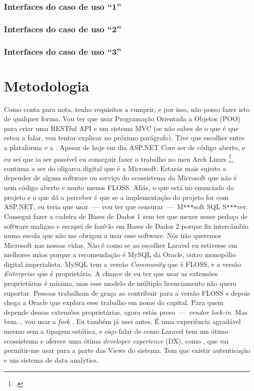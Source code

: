 \documentclass[12pt,a4paper,openright,oneside]{memoir}
\begin{document}
\subsubsection{Interfaces do caso de uso “1”}
\subsubsection{Interfaces do caso de uso “2”}
\subsubsection{Interfaces do caso de uso “3”}

\section{Metodologia}

Como conta para nota, tenho requisitos a cumprir, e por isso, não posso fazer
isto de qualquer forma. Vou ter que usar Programação Orientada a Objetos (POO)
para criar uma RESTful API e um sistema MVC (se não sabes de o que é que estou
a falar, vou tentar explicar no próximo parágrafo). Tive que escolher entre a
plataforma \autocite{laravel} e a \autocite{aspnet_core}. Apesar de hoje em dia
ASP.NET Core ser de código aberto, e eu sei que ia ser possível eu conseguir
fazer o trabalho no meu Arch Linux \footcite{tsoding}, continua a ser do
oligarca digital que é a Microsoft. Estarás mais sujeito a depender de algum
software ou serviço do ecossistema da Microsoft que não é nem código aberto e
muito menos FLOSS. Aliás, o que está no enunciado do projeto e o que dá a
perceber é que se a implementação do projeto for com ASP.NET, eu teria que
usar\mbox{ --- }vou ter que censurar\mbox{ --- }M\texttt{***}soft SQL
S\texttt{***}ver. Consegui fazer a cadeira de Bases de Dados 1 sem ter que
mexer nesse pedaço de software maligno e escapei de fazê-lo em Bases de Dados 2
porque fiz intercâmbio numa escola que não me obrigou a usar esse software. Nós
não queremos Microsoft nas nossas vidas. Não é como se ao escolher Laravel eu
estivesse em melhores mãos porque a recomendação é MySQL da Oracle, outro
monopólio digital imperialista. MySQL tem a versão \textit{Community} que é
FLOSS, e a versão \textit{Enterprise} que é proprietária. A chance de eu ter
que usar as extensões proprietárias é mínima, mas esse modelo de múltiplo
licenciamento não quero suportar. Pessoas trabalham de graça ao contribuir para
a versão FLOSS e depois chega a Oracle que explora esse trabalho em nome do
capital. Para quem depende dessas extensões proprietárias, agora estás
preso\mbox{ --- }\textit{vendor lock-in}. Mas bem... vou usar a \textit{fork}
\autocite{mariadb_foundation}. Eu também já usei \autocite{php} antes. É uma
experiência agradável mesmo sem a tipagem estática, e oiço falar de como
Laravel tem um ótimo ecossistema e oferece uma ótima \textit{developer
experience} (DX), como \autocite{inertiajs}, que vai permitir-me usar
\autocite{svelte} para a parte das Views do sistema. Tem que existir
autenticação e um sistema de data analytics.
\end{document}

